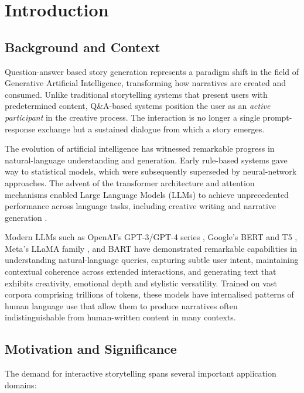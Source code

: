 \chapter{Introduction}
\label{ch:intro}

\section{Background and Context}
Question-answer based story generation represents a paradigm shift in
the field of Generative Artificial Intelligence, transforming how
narratives are created and consumed. Unlike traditional storytelling
systems that present users with predetermined content, Q\&A-based
systems position the user as an \emph{active participant} in the
creative process. The interaction is no longer a single prompt-response
exchange but a sustained dialogue from which a story emerges.

The evolution of artificial intelligence has witnessed remarkable
progress in natural-language understanding and generation. Early
rule-based systems gave way to statistical models, which were
subsequently superseded by neural-network approaches. The advent of
the transformer architecture \cite{vaswani2017attention} and
attention mechanisms enabled Large Language Models (LLMs) to achieve
unprecedented performance across language tasks, including creative
writing and narrative generation
\cite{brown2020gpt3,openai2023gpt4,touvron2023llama,jiang2023mistral}.

Modern LLMs such as OpenAI's GPT-3/GPT-4 series \cite{openai2023gpt4},
Google's BERT and T5 \cite{devlin2019bert}, Meta's LLaMA family
\cite{touvron2023llama}, and BART \cite{lewis2020bart} have demonstrated
remarkable capabilities in understanding natural-language queries,
capturing subtle user intent, maintaining contextual coherence across
extended interactions, and generating text that exhibits creativity,
emotional depth and stylistic versatility. Trained on vast corpora
comprising trillions of tokens, these models have internalised
patterns of human language use that allow them to produce narratives
often indistinguishable from human-written content in many contexts.

\section{Motivation and Significance}
The demand for interactive storytelling spans several important
application domains:

